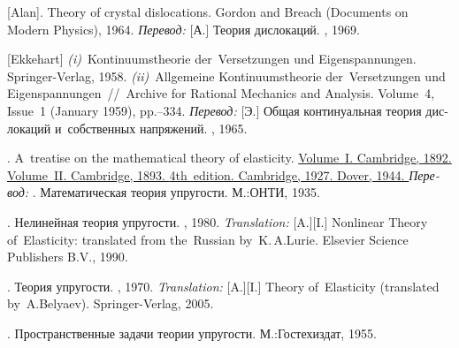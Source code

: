 \begin{thebibliography}{123}
\begin{otherlanguage}{russian}
[Alan].
Theory of crystal dislocations.
Gordon and Breach
(Documents on Modern Physics),
1964.
\emph{Перевод:}
[А.]
Теория дислокаций.
\mirpublisher, 1969.

[Ekkehart] \emph{(i)}~Kontinuumstheorie der~Versetzungen und Eigen\-spannung\-en. Springer\hbox{-}Verlag, 1958. 
\emph{(ii)}~Allgemeine Kontinuumstheorie der~Versetzungen und Eigen\-span\-nung\-en~//~Archive for Rational Mechanics and Analysis. Volume~4, Issue~1 (January 1959), pp.\hbox{--}334.
\emph{Перевод:} [Э.] Общая континуальная теория дислокаций и~собственных напряжений. \mirpublisher, 1965. 

.
A~treatise on the mathematical theory of elasticity.
\href{https://hal.archives-ouvertes.fr/hal-01307751/document}{
Volume~I.
Cambridge, 1892.
}
\href{https://archive.org/details/in.ernet.dli.2015.503659}{
Volume~II.
Cambridge, 1893.
}
\href{https://archive.org/details/in.ernet.dli.2015.462644/page/n1}{
4th~edition.
Cambridge, 1927.
Dover, 1944.
}
\emph{Перевод:}
.
Математическая теория упругости.
М.:\;ОНТИ,
1935.

.
Нелинейная теория упругости.
\naukapublisher, 1980.
\emph{Translation:}
[A.][I.]
Nonlinear Theory of~Elasticity:
translated from the~Russian by~K.\,A.\;Lurie.
Elsevier Science Publishers \hbox{B.\hspace{.1ex}V\hspace{-0.2ex}.}, 1990.

.
Теория упругости.
\naukapublisher, 1970.
\emph{Translation:}
[A.][I.]
Theory of~Elasticity (translated by~A.\:Belyaev).
Springer-Verlag, 2005.

.
Пространственные задачи теории упругости.
М.:\;Гос\-тех\-издат, 1955.


\end{otherlanguage}
\end{thebibliography}
